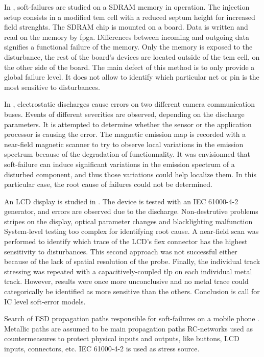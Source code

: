 In \cite{SDRAMCase}, soft-failures are studied on a SDRAM memory in operation.
The injection setup consists in a modified \gls{tem} cell with a reduced septum height for increased field strenghts.
The SDRAM chip is mounted on a board.
Data is written and read on the memory by \gls{fpga}.
Differences between incoming and outgoing data signifies a functional failure of the memory.
Only the memory is exposed to the disturbance, the rest of the board's devices are located outside of the \gls{tem} cell, on the other side of the board.
The main defect of this method is to only provide a global failure level.
It does not allow to identify which particular net or pin is the most sensitive to disturbances.

In \cite{softFailSubsystem}, electrostatic discharges cause errors on two different camera communication buses.
Events of different severities are observed, depending on the discharge parameters.
It is attempted to determine whether the sensor or the application processor is causing the error.
The magnetic emission map is recorded with a near-field magnetic scanner to try to observe local variations in the emission spectrum because of the degradation of functionnality.
It was envisionned that soft-failure can induce significant variations in the emission spectrum of a disturbed component, and thus those variations could help localize them.
In this particular case, the root cause of failures could not be determined.

An LCD display is studied in \cite{softFailLCD}.
The device is tested with an IEC 61000-4-2 \cite{iec61000-4-2} generator, and errors are observed due to the discharge.
Non-destrutive problems
stripes on the display, optical parameter changes and blacklighting malfunction
System-level testing too complex for identifying root cause.
A near-field scan was performed to identify which trace of the LCD's flex connector has the highest sensitivity to disturbances.
This second approach was not successful either because of the lack of spatial resolution of the probe.
Finally, the individual track stressing was repeated with a capacitively-coupled \gls{tlp} on each individual metal track.
However, results were once more unconclusive and no metal trace could categorically be identified as more sensitive than the others.
Conclusion is call for IC level soft-error models.

Search of ESD propagation paths responsible for soft-failures on a mobile phone \cite{softFailMobile}.
Metallic paths are assumed to be main propagation paths
RC-networks used as countermeasures to protect physical inputs and outputs, like buttons, LCD inputs, connectors, etc.
IEC 61000-4-2 is used as stress source.

